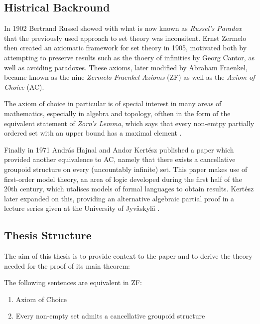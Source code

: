\documentclass[../../main.tex]{subfiles}
\begin{document}
\subsection*{Histrical Backround}

In 1902 Bertrand Russel showed with what is now known as \textit{Russel's Paradox} that the previously used approach to set theory was inconsitent.
Ernst Zermelo then created an axiomatic framework for set theory in 1905, motivated both by attempting to preserve results such as the thoery of infinities by Georg Cantor, as well as avoiding paradoxes.
These axioms, later modified by Abraham Fraenkel, became known as the nine \textit{Zermelo-Fraenkel Axioms} (ZF) as well as the \textit{Axiom of Choice} (AC)\cite[pp.66-70, 75]{Gol17}.

The axiom of choice in particular is of special interest in many areas of mathematics, especially in algebra and topology, ofthen in the form of the equivalent statement of \textit{Zorn's Lemma},
which says that every non-emtpy partially ordered set with an upper bound has a maximal element \cite{Jec78}.

Finally in 1971 András Hajnal and Andor Kertész published a paper \cite{Haj72} which provided another equivalence to AC, namely that there exists a cancellative groupoid structure on every (uncountably infinite) set.
This paper makes use of first-order model theory, an area of logic developed during the first half of the 20th century, which utalises models of formal languages to obtain results.
Kertész later expanded on this, providing an alternative algebraic partial proof in a lecture series given at the University of Jyväskylä \cite{Ker75}.

\subsection*{Thesis Structure}

The aim of this thesis is to provide context to the paper \cite{Haj72} and to derive the theory needed for the proof of its main theorem:
\begin{theorem}
    The following sentences are equivalent in ZF:
    \begin{enumerate}
        \item Axiom of Choice
        \item Every non-empty set admits a cancellative groupoid structure
    \end{enumerate}
\end{theorem}
\end{document}
